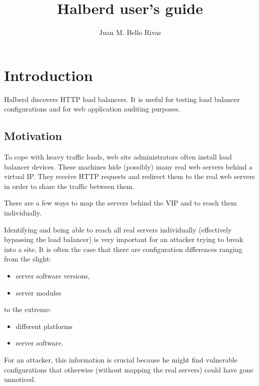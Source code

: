 \documentclass[a4paper]{book}
\begin{document}
\title{Halberd user's guide}
\author{Juan M. Bello Rivas}
\maketitle

\tableofcontents


\chapter{Introduction}

Halberd discovers HTTP load balancers. It is useful for testing load balancer
configurations and for web application auditing purposes. 

\section{Motivation}

To cope with heavy traffic loads, web site administrators often install load
balancer devices. These machines hide (possibly) many real web servers behind
a virtual IP. They receive HTTP requests and redirect them to the real web
servers in order to share the traffic between them.

There are a few ways to map the servers behind the VIP and to reach them
individually.

Identifying and being able to reach all real servers individually (effectively
bypassing the load balancer) is very important for an attacker trying to break
into a site. It is often the case that there are configuration differences
ranging from the slight:

\begin{itemize}
  \item server software versions,
  \item server modules
\end{itemize}

to the extreme:

\begin{itemize}
  \item different platforms
  \item server software.
\end{itemize}

For an attacker, this information is crucial because he might find vulnerable
configurations that otherwise (without mapping the real servers) could have
gone unnoticed.
\end{document}
